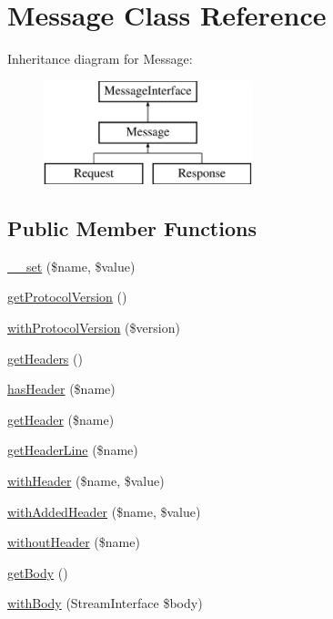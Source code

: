 \hypertarget{class_pes_1_1_http_1_1_message}{}\section{Message Class Reference}
\label{class_pes_1_1_http_1_1_message}
Inheritance diagram for Message\+:\begin{figure}[H]
\begin{center}
\leavevmode
\includegraphics[height=3.000000cm]{class_pes_1_1_http_1_1_message}
\end{center}
\end{figure}
\subsection*{Public Member Functions}
\begin{DoxyCompactItemize}
\item 
\mbox{\hyperlink{class_pes_1_1_http_1_1_message_a83c2703c91959192f759992ad5640b67}{\+\_\+\+\_\+set}} (\$name, \$value)
\item 
\mbox{\hyperlink{class_pes_1_1_http_1_1_message_a915c3328b367338a7c0eddb1e3294e9a}{get\+Protocol\+Version}} ()
\item 
\mbox{\hyperlink{class_pes_1_1_http_1_1_message_a96527577349f271afb58287162b40e67}{with\+Protocol\+Version}} (\$version)
\item 
\mbox{\hyperlink{class_pes_1_1_http_1_1_message_a157e0005d82edaa21cbea07fdc5c62da}{get\+Headers}} ()
\item 
\mbox{\hyperlink{class_pes_1_1_http_1_1_message_ad506774d2e42c7e4ec4b5f05009889b4}{has\+Header}} (\$name)
\item 
\mbox{\hyperlink{class_pes_1_1_http_1_1_message_a5b0169d9fabf145a619f35da410bc5d0}{get\+Header}} (\$name)
\item 
\mbox{\hyperlink{class_pes_1_1_http_1_1_message_a365fa6b4f521682cab038b8ad9bff195}{get\+Header\+Line}} (\$name)
\item 
\mbox{\hyperlink{class_pes_1_1_http_1_1_message_a7bcc16e8478896e34d4c54cfb3c5eab5}{with\+Header}} (\$name, \$value)
\item 
\mbox{\hyperlink{class_pes_1_1_http_1_1_message_a05ad08277c49a818e9c1a6ef4d613683}{with\+Added\+Header}} (\$name, \$value)
\item 
\mbox{\hyperlink{class_pes_1_1_http_1_1_message_a0760196405b22044faa1ed0b8f36e540}{without\+Header}} (\$name)
\item 
\mbox{\hyperlink{class_pes_1_1_http_1_1_message_ad7bab1db052fb9fcc8bd0b4f3eac29ac}{get\+Body}} ()
\item 
\mbox{\hyperlink{class_pes_1_1_http_1_1_message_a0a434fb2c8bb00e0e0e3505991e2eaaf}{with\+Body}} (Stream\+Interface \$body)
\end{DoxyCompactItemize}

